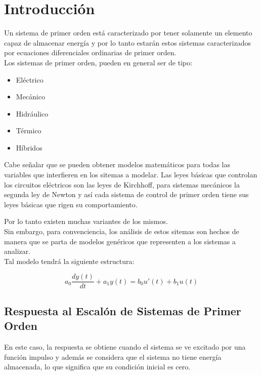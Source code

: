 \documentclass[12pt]{article}
\begin{document}
\section{Introducción}

Un sistema de primer orden está caracterizado por tener solamente un elemento capaz de almacenar energía y por lo tanto estarán estos sistemas caracterizados por ecuaciones diferenciales ordinarias de primer orden.\\

Los sistemas de primer orden, pueden en general ser de tipo:
\begin{itemize}
\item Eléctrico
\item Mecánico
\item Hidráulico
\item Térmico
\item Híbridos
\end{itemize}

Cabe señalar que se pueden obtener modelos matemáticos para todas las variables que interfieren en los sitemas a modelar. Las leyes básicas que controlan los circuitos eléctricos son las leyes de Kirchhoff, para sistemas mecánicos la segunda ley de Newton y así cada sistema de control de primer orden tiene sus leyes básicas que rigen su comportamiento.

Por lo tanto existen muchas variantes de los mismos.\\

Sin embargo, para convenciencia, los análisis de estos sitemas son hechos de manera que se parta de modelos genéricos que representen a los sistemas a analizar.\\

Tal modelo tendrá la siguiente estructura:

\begin{equation}
a_0\frac{dy(t)}{dt}+a_1y(t)=b_0u'(t)+b_1u(t)
\end{equation}



\subsection{Respuesta al Escalón de Sistemas de Primer Orden}

En este caso, la respuesta se obtiene cuando el sistema se ve excitado por una función impulso y además se considera que el sistema no tiene energía almacenada, lo que significa que su condición inicial es cero.\\
\end{document}
